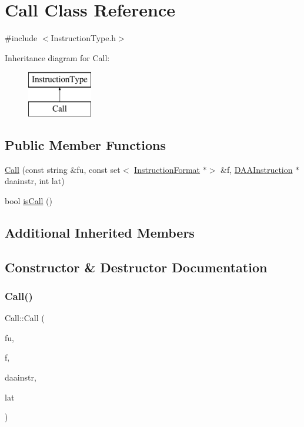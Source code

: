 \hypertarget{classCall}{}\section{Call Class Reference}
\label{classCall}


{\ttfamily \#include $<$Instruction\+Type.\+h$>$}

Inheritance diagram for Call\+:\begin{figure}[H]
\begin{center}
\leavevmode
\includegraphics[height=2.000000cm]{classCall}
\end{center}
\end{figure}
\subsection*{Public Member Functions}
\begin{DoxyCompactItemize}
\item 
\hyperlink{classCall_aee7968e3a6ac87d916362eb567417349}{Call} (const string \&fu, const set$<$ \hyperlink{classInstructionFormat}{Instruction\+Format} $\ast$$>$ \&f, \hyperlink{classDAAInstruction}{D\+A\+A\+Instruction} $\ast$daainstr, int lat)
\item 
bool \hyperlink{classCall_a2f33492c84abcac87ff5e388535f6cfb}{is\+Call} ()
\end{DoxyCompactItemize}
\subsection*{Additional Inherited Members}


\subsection{Constructor \& Destructor Documentation}
\mbox{\label{classCall_aee7968e3a6ac87d916362eb567417349}} 
\subsubsection{\texorpdfstring{Call()}{Call()}}
{\footnotesize\ttfamily Call\+::\+Call (\begin{DoxyParamCaption}\item[{const string \&}]{fu,  }\item[{const set$<$ \hyperlink{classInstructionFormat}{Instruction\+Format} $\ast$$>$ \&}]{f,  }\item[{\hyperlink{classDAAInstruction}{D\+A\+A\+Instruction} $\ast$}]{daainstr,  }\item[{int}]{lat }\end{DoxyParamCaption})}



